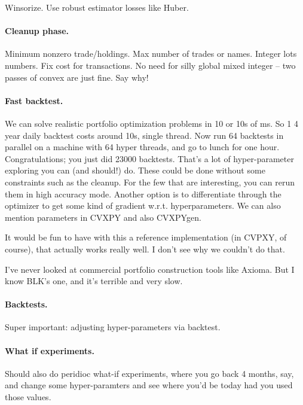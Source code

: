 \documentclass[12pt]{article}
\begin{document}
Winsorize.  Use robust estimator losses like Huber.

\paragraph{Cleanup phase.}   Minimum nonzero trade/holdings.  Max number of
trades or names.  Integer lots numbers.  Fix cost for transactions.
No need for silly global mixed integer -- two passes of convex are just fine.
Say why!

\paragraph{Fast backtest.}  We can solve realistic portfolio optimization problems in 10
or 10s of ms.  So 1 4 year daily backtest costs around 10s, single thread.  Now
run 64 backtests in parallel on a machine with 64 hyper threads, and go to
lunch for one hour.   Congratulations; you just did 23000 backtests.   That’s a
lot of hyper-parameter exploring you can (and should!) do. These could be done
without some constraints such as the cleanup.  For the few that are
interesting, you can rerun them in high accuracy mode.   Another option is to
differentiate through the optimizer to get some kind of gradient w.r.t.
hyperparameters.   We can also mention parameters in CVXPY and also CVXPYgen.

It would be fun to have with this a reference implementation (in CVPXY, of
course), that actually works really well.  I don’t see why we couldn’t do that.

I’ve never looked at commercial portfolio construction tools like Axioma.  But
I know BLK’s one, and it’s terrible and very slow.

\paragraph{Backtests.}
Super important: adjusting hyper-parameters via backtest.




\paragraph{What if experiments.}
Should also do peridioc what-if experiments, where you go back 4 months, say,
and change some hyper-paramters and see where you'd be today had you used those values.
\end{document}

